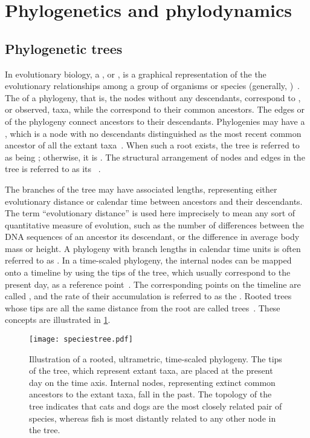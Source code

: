 \section{Phylogenetics and phylodynamics}
\label{sec:phylo}

\subsection{Phylogenetic trees}

In evolutionary biology, a , or , is a
graphical representation of the the evolutionary relationships among a group of
organisms or species (generally, )~\autocite{haeckel1866generelle}.
The  of a phylogeny, that is, the nodes without any descendants,
correspond to , or observed, taxa, while the 
correspond to their common ancestors. The edges or  of the
phylogeny connect ancestors to their descendants. Phylogenies may have a
, which is a node with no descendants distinguished as the most
recent common ancestor of all the extant
taxa~\autocite{harding1971probabilities}. When such a root exists, the tree is
referred to as being ; otherwise, it is . The
structural arrangement of nodes and edges in the tree is referred to as its
~\autocite{cavalli1967phylogenetic}. 

The branches of the tree may have associated lengths, representing either
evolutionary distance or calendar time between ancestors and their descendants.
The term ``evolutionary distance'' is used here imprecisely to mean any sort of
quantitative measure of evolution, such as the number of differences between
the DNA sequences of an ancestor its descendant, or the difference in average
body mass or height. A phylogeny with branch lengths in calendar time units is
often referred to as . In a time-scaled phylogeny, the
internal nodes can be mapped onto a timeline by using the tips of the tree,
which usually correspond to the present day, as a reference
point~\autocite{nee1992tempo}. The corresponding points on the timeline are
called , and the rate of their accumulation is referred
to as the . Rooted trees whose tips are all the same
distance from the root are called 
trees~\autocite{buneman1974note}. These concepts are illustrated in
\cref{fig:speciestree}.

\begin{figure}[ht]
  \centering
  \texttt{[image: speciestree.pdf]}
  \caption[Illustration of a rooted, ultrametric, time-scaled phylogeny]
    {Illustration of a rooted, ultrametric, time-scaled phylogeny. The tips of
      the tree, which represent extant taxa, are placed at the present day on
      the time axis. Internal nodes, representing extinct common ancestors to
      the extant taxa, fall in the past. The topology of the tree indicates
      that cats and dogs are the most closely related pair of species, whereas
      fish is most distantly related to any other node in the tree.}
  \label{fig:speciestree}
\end{figure}

